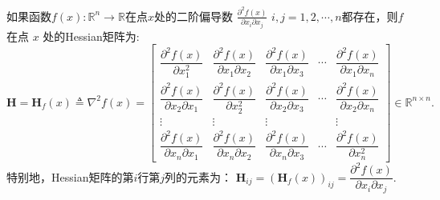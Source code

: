 \begin{definition}[Hessian矩阵]
	如果函数$f(x): \mathbb{R}^n \to \mathbb{R}$在点$x$处的二阶偏导数
		$\frac{\partial^2 f(x)}{\partial x_i \partial x_j}$ $i,j
		=1,2,\cdots,n$都存在，则$f$ 在点 $x$ 处的\rm{Hessian}矩阵为:
		\[ 
		\mathbf{H} = \mathbf{H}_f \left( x\right)  \triangleq \nabla^2 f(x) =
		\begin{bmatrix}
			\dfrac{\partial^2 f(x)}{\partial x_1^2}            & \dfrac{\partial^2 f(x)}{\partial x_1 \partial x_2} & \dfrac{\partial^2 f(x)}{\partial x_1 \partial x_3} & \cdots & \dfrac{\partial^2 f(x)}{\partial x_1 \partial x_n} \\
			\dfrac{\partial^2 f(x)}{\partial x_2 \partial x_1} & \dfrac{\partial^2 f(x)}{\partial x_2^2}            & \dfrac{\partial^2 f(x)}{\partial x_2 \partial x_3} & \cdots & \dfrac{\partial^2 f(x)}{\partial x_2 \partial x_n} \\
			\vdots                                             & \vdots                                             & \vdots                                             &        & \vdots                                             \\
			\dfrac{\partial^2 f(x)}{\partial x_n \partial x_1} & \dfrac{\partial^2 f(x)}{\partial x_n \partial x_2} & \dfrac{\partial^2 f(x)}{\partial x_n \partial x_3} & \cdots & \dfrac{\partial^2 f(x)}{\partial x_n^2}            
		\end{bmatrix}
		 \in \mathbb{R}^{n \times n}.
		\]
		特别地，Hessian矩阵的第$i$行第$j$列的元素为： $ \mathbf{H}_{ij} = \left(\mathbf{H}_f\left( x\right)  \right)_{ij} = \dfrac{\partial^2 f(x)}{\partial x_i \partial x_j}.$
\end{definition}